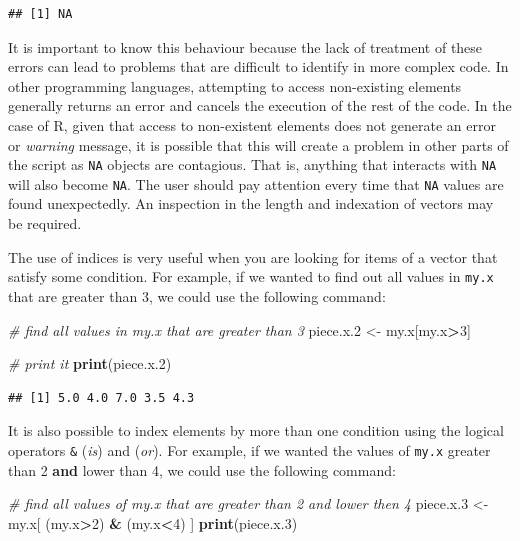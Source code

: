 \documentclass[11pt,]{book}
\newenvironment{Shaded}{\begin{snugshade}}{\end{snugshade}}
\newcommand{\KeywordTok}[1]{\textcolor[rgb]{0.27,0.27,0.27}{\textbf{#1}}}
\newcommand{\DecValTok}[1]{\textcolor[rgb]{0.06,0.06,0.06}{#1}}
\newcommand{\StringTok}[1]{\textcolor[rgb]{0.5,0.5,0.5}{#1}}
\newcommand{\CommentTok}[1]{\textcolor[rgb]{0.56,0.35,0.01}{\textit{#1}}}
\newcommand{\OperatorTok}[1]{\textcolor[rgb]{0.81,0.36,0.00}{\textbf{#1}}}
\newcommand{\NormalTok}[1]{#1}
\begin{document}
\begin{verbatim}
## [1] NA
\end{verbatim}

It is important to know this behaviour because the lack of treatment of
these errors can lead to problems that are difficult to identify in more
complex code. In other programming languages, attempting to access
non-existing elements generally returns an error and cancels the
execution of the rest of the code. In the case of R, given that access
to non-existent elements does not generate an error or \emph{warning}
message, it is possible that this will create a problem in other parts
of the script as \texttt{NA} objects are contagious. That is, anything
that interacts with \texttt{NA} will also become \texttt{NA}. The user
should pay attention every time that \texttt{NA} values are found
unexpectedly. An inspection in the length and indexation of vectors may
be required.

The use of indices is very useful when you are looking for items of a
vector that satisfy some condition. For example, if we wanted to find
out all values in \texttt{my.x} that are greater than 3, we could use
the following command:

\begin{Shaded}
\begin{Highlighting}[]
\CommentTok{# find all values in my.x that are greater than 3}
\NormalTok{piece.x.}\DecValTok{2}\NormalTok{ <-}\StringTok{ }\NormalTok{my.x[my.x}\OperatorTok{>}\DecValTok{3}\NormalTok{]}

\CommentTok{# print it}
\KeywordTok{print}\NormalTok{(piece.x.}\DecValTok{2}\NormalTok{) }
\end{Highlighting}
\end{Shaded}

\begin{verbatim}
## [1] 5.0 4.0 7.0 3.5 4.3
\end{verbatim}

It is also possible to index elements by more than one condition using
the logical operators \texttt{\&} (\emph{is}) and \texttt{\textbar{}}
(\emph{or}). For example, if we wanted the values of \texttt{my.x}
greater than 2 \textbf{and} lower than 4, we could use the following
command: 

\begin{Shaded}
\begin{Highlighting}[]
\CommentTok{# find all values of my.x that are greater than 2 and lower then 4}
\NormalTok{piece.x.}\DecValTok{3}\NormalTok{ <-}\StringTok{ }\NormalTok{my.x[ (my.x}\OperatorTok{>}\DecValTok{2}\NormalTok{) }\OperatorTok{&}\StringTok{ }\NormalTok{(my.x}\OperatorTok{<}\DecValTok{4}\NormalTok{) ]}
\KeywordTok{print}\NormalTok{(piece.x.}\DecValTok{3}\NormalTok{)}
\end{Highlighting}
\end{Shaded}
\end{document}
